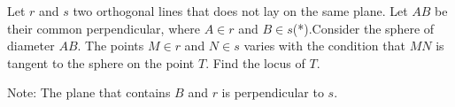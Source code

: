 Let $ r$ and $ s$ two orthogonal lines that does not lay on the same plane. Let $ AB$ be their common perpendicular, where $ A\in{}r$ and $ B\in{}s$(*).Consider the sphere of diameter $ AB$. The points $ M\in{r}$ and $ N\in{s}$ varies with the condition that $ MN$ is tangent to the sphere on the point $ T$. Find the locus of $ T$.

Note: The plane that contains $ B$ and $ r$ is perpendicular to $ s$.